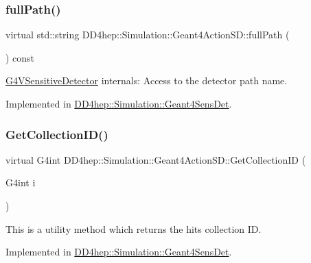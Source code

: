 \subsubsection{\texorpdfstring{full\+Path()}{fullPath()}}
{\footnotesize\ttfamily virtual std\+::string D\+D4hep\+::\+Simulation\+::\+Geant4\+Action\+S\+D\+::full\+Path (\begin{DoxyParamCaption}{ }\end{DoxyParamCaption}) const\hspace{0.3cm}{\ttfamily [pure virtual]}}



\hyperlink{class_g4_v_sensitive_detector}{G4\+V\+Sensitive\+Detector} internals\+: Access to the detector path name. 



Implemented in \hyperlink{class_d_d4hep_1_1_simulation_1_1_geant4_sens_det_a0a5229cabfdd17f1f370954c9cf9130c}{D\+D4hep\+::\+Simulation\+::\+Geant4\+Sens\+Det}.

\hypertarget{class_d_d4hep_1_1_simulation_1_1_geant4_action_s_d_ac0539610b17b20d10592201b1eb0755d}{}\label{class_d_d4hep_1_1_simulation_1_1_geant4_action_s_d_ac0539610b17b20d10592201b1eb0755d} 
\subsubsection{\texorpdfstring{Get\+Collection\+I\+D()}{GetCollectionID()}}
{\footnotesize\ttfamily virtual G4int D\+D4hep\+::\+Simulation\+::\+Geant4\+Action\+S\+D\+::\+Get\+Collection\+ID (\begin{DoxyParamCaption}\item[{G4int}]{i }\end{DoxyParamCaption})\hspace{0.3cm}{\ttfamily [pure virtual]}}



This is a utility method which returns the hits collection ID. 



Implemented in \hyperlink{class_d_d4hep_1_1_simulation_1_1_geant4_sens_det_acabf73f9ac2fd034b02bb24d12db8347}{D\+D4hep\+::\+Simulation\+::\+Geant4\+Sens\+Det}.



